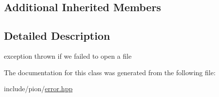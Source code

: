 \subsection*{Additional Inherited Members}


\subsection{Detailed Description}
exception thrown if we failed to open a file 

The documentation for this class was generated from the following file\-:\begin{DoxyCompactItemize}
\item 
include/pion/\hyperlink{error_8hpp}{error.\-hpp}\end{DoxyCompactItemize}

